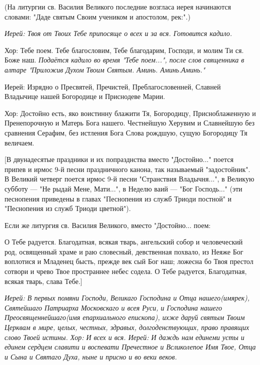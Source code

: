   (На литургии св. Василия Великого последние возгласа иерея начинаются словами: "Даде святым Своим учеником и апостолом, рек:".)


\itshape  Иерей:\normalfont{} Твоя от Твоих Тебе припосяще о всех и за вся. \itshape  Готовится кадило\normalfont{}. \itshape 


Хор:\normalfont{} Тебе поем. Тебе благословим, Тебе благодарим, Господи, и молим Ти ся. Боже наш. \itshape  Подаётся кадило во время "Тебе поем...", после слов священника в алтаре "Приложив Духом Твоим Святым. Аминь. Аминь.Аминь.\normalfont{}"  \itshape 


  Иерей:\normalfont{} Изрядно о Пресвятей, Пречистей, Преблагословенней, Славней Владычице нашей Богородице и Приснодеве Марии. \itshape 


Хор:\normalfont{} Достойно есть, яко воистинну блажити Тя, Богородицу, Присноблаженную и Пренепорочную и Матерь Бога нашего. Честнейшую Херувим и Славнейшую без сравнения Серафим, без истления Бога Слова рождшую, сущую Богородицу Тя величаем. 


 [В двунадесятые праздники и их попразднства вместо "Достойно..." поется припев и ирмос 9-й песни праздничного канона, так называемый "задостойник". В Великий четверг поется ирмос 9-й песни "Странствия Владычня...", в Великую субботу — "Не рыдай Мене, Мати...", в Неделю ваий — "Бог Господь..." (эти песнопения приведены в главах "Песнопения из служб Триоди постной" и "Песнопения из служб Триоди цветной").


 Если же литургия св. Василия Великого, вместо "Достойно... поем: 


      О Тебе радуется. Благодатная, всякая тварь, ангельский собор и человеческий род, освященный храме и раю словесный, девственная похвало, из Неяже Бог воплотися и Младенец бысть, прежде век сый Бог наш; ложесна бо Твоя престол сотвори и чрево Твое пространнее небес содела. О Тебе радуется, Благодатная, всякая тварь, слава Тебе.]


\itshape  Иерей:\normalfont{} В первых помяни Господи, Великаго Господина и Отца нашего\itshape  (имярек),\normalfont{} Святейшаго Патриарха Московскаго и всея Руси, и Господина нашего Преосвященнейшаго\itshape  (имя епархиального епископ\normalfont{}а), ихже даруй святым Твоим Церквам в мире, целых, честных, здравых, долгоденствующих, право правящих слово Твоей истины. \itshape  Хор:\normalfont{} И всех и вся. \itshape  Иерей:\normalfont{} И даждь нам единеми усты и единем сердцем славити и воспевати Пречестно\itshape е\normalfont{} и Всликолепое Имя Твое, Отца и Сына и Святаго Духа, ныне и присно и во веки веков. \itshape 


